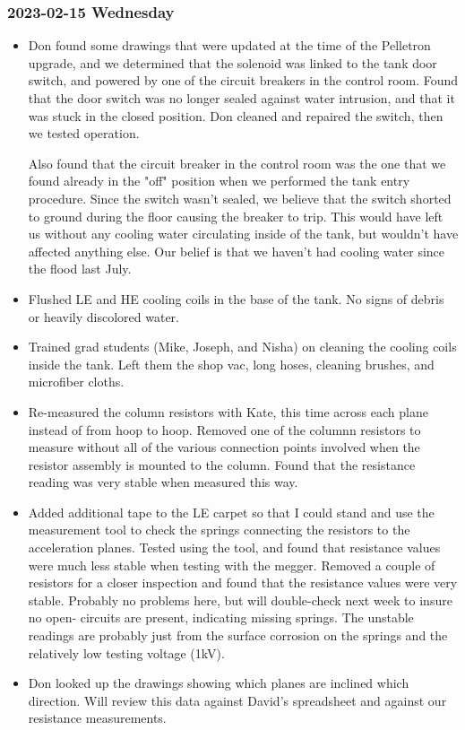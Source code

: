 \documentclass{scrartcl}
\begin{document}
\subsubsection{2023-02-15 Wednesday}
\begin{itemize}
    \item Don found some drawings that were updated at the time of the 
    Pelletron upgrade, and we determined that the solenoid was linked to
	the tank door switch, and powered by one of the circuit breakers in
	the control room.  Found that the door switch was no longer sealed
	against water intrusion, and that it was stuck in the closed position.
	Don cleaned and repaired the switch, then we tested operation.  \par
	Also found that the circuit breaker in the control room was the one
	that we found already in the "off" position when we performed the 
	tank entry procedure.  Since the switch wasn't sealed, we believe
	that the switch shorted to ground during the floor causing the breaker
	to trip.  This would have left us without any cooling water circulating
	inside of the tank, but wouldn't have affected anything else.  Our 
	belief is that we haven't had cooling water since the flood last July.
	\item Flushed LE and HE cooling coils in the base of the tank.  No signs 
	of debris or heavily discolored water.  
	\item Trained grad students (Mike, Joseph, and Nisha) on cleaning the
	cooling coils inside the tank.  Left them the shop vac, long hoses,
	cleaning brushes, and microfiber cloths.
	\item Re-measured the column resistors with Kate, this time across 
	each plane instead of from hoop to hoop.  Removed one of the columnn
	resistors to measure without all of the various connection points
	involved when the resistor assembly is mounted to the column.  Found
	that the resistance reading was very stable when measured this way.
	\item Added additional tape to the LE carpet so that I could stand
	and use the measurement tool to check the springs connecting the
	resistors to the acceleration planes.  Tested using the tool, and
	found that resistance values were much less stable when testing 
	with the megger.  Removed a couple of resistors for a closer inspection
    and found that the resistance values were very stable.  Probably 
	no problems here, but will double-check next week to insure no open-
	circuits are present, indicating missing springs.  The unstable readings
	are probably just from the surface corrosion on the springs and the 
	relatively low testing voltage (1kV).  
	\item Don looked up the drawings showing which planes are inclined 
	which direction.  Will review this data against David's spreadsheet
	and against our resistance measurements.  
\end{itemize}
\end{document}
